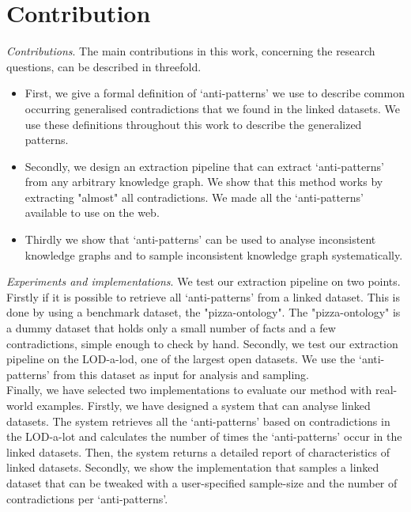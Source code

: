\documentclass[11pt,letterpaper ,oneside ]{book}
\begin{document}
	\section{Contribution}
	\textit{Contributions}. 
	The main contributions in this work, concerning the research questions, can be described in threefold.
	\begin{itemize}
		\item First, we give a formal definition of `anti-patterns' we use to describe common occurring generalised contradictions that we found in the linked datasets. We use these definitions throughout this work to describe the generalized patterns.
		\item Secondly, we design an extraction pipeline that can extract `anti-patterns' from any arbitrary knowledge graph. We show that this method works by extracting "almost" all contradictions. We made all the `anti-patterns' available to use on the web.
		\item Thirdly we show that `anti-patterns' can be used to analyse inconsistent knowledge graphs and to sample inconsistent knowledge graph systematically.
	\end{itemize}
	
	\textit{Experiments and implementations}. We test our extraction pipeline on two points. Firstly if it is possible to retrieve all `anti-patterns' from a linked dataset. This is done by using a benchmark dataset, the "pizza-ontology". The "pizza-ontology" is a dummy dataset that holds only a small number of facts and a few contradictions, simple enough to check by hand. Secondly, we test our extraction pipeline on the LOD-a-lod, one of the largest open datasets. We use the `anti-patterns' from this dataset as input for analysis and sampling.\\
	
	Finally, we have selected two implementations to evaluate our method with real-world examples. Firstly, we have designed a system that can analyse linked datasets. The system retrieves all the  `anti-patterns' based on contradictions in the LOD-a-lot and calculates the number of times the `anti-patterns' occur in the linked datasets. Then, the system returns a detailed report of characteristics of linked datasets.
	Secondly, we show the implementation that samples a linked dataset that can be tweaked with a user-specified sample-size and the number of contradictions per `anti-patterns'. \\
	
\end{document}
